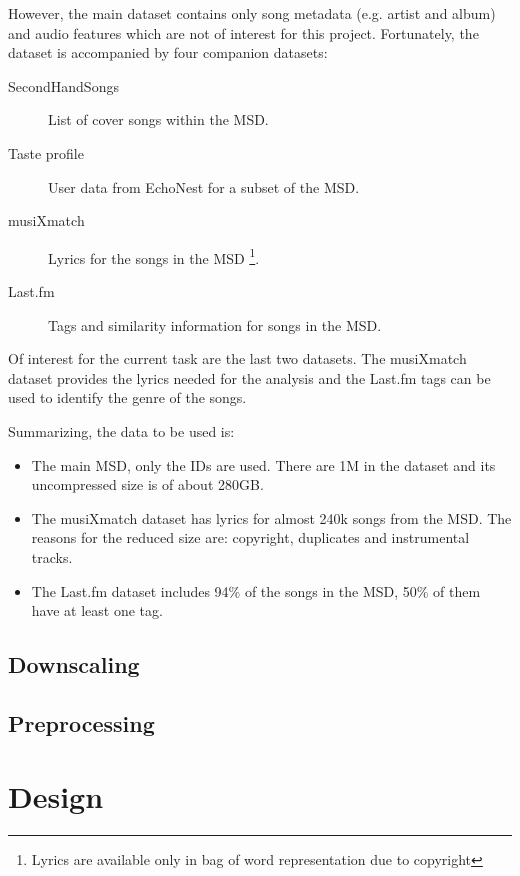 \documentclass[11pt,a4paper,twoside]{scrartcl}
\begin{document}
    However, the main dataset contains only song metadata
    (e.g. artist and album) and audio features which are not of interest
    for this project. Fortunately, the dataset is accompanied by four companion
    datasets:
    
    \begin{description}
      \item[SecondHandSongs] List of cover songs within the MSD.
      \item[Taste profile] User data from EchoNest for a subset of the MSD.
      \item[musiXmatch] Lyrics for the songs in the MSD
                        \footnote{Lyrics are available only in bag of word
                                  representation due to copyright}.
      \item[Last.fm] Tags and similarity information for songs in the MSD.
    \end{description}
    
    Of interest for the current task are the last two datasets. The musiXmatch
    dataset provides the lyrics needed for the analysis and the Last.fm tags can
    be used to identify the genre of the songs.
    
    Summarizing, the data to be used is:
    
    \begin{itemize}
      \item The main MSD, only the IDs are used. There are 1M in the
            dataset and its uncompressed size is of about 280GB.
      \item The musiXmatch dataset has lyrics for almost 240k songs from the
            MSD. The reasons for the reduced size are: copyright, duplicates and
            instrumental tracks.
      \item The Last.fm dataset includes 94\% of the songs in the MSD, 50\% of
            them have at least one tag.
    \end{itemize}

    \subsection{Downscaling}

    \subsection{Preprocessing}
  \section{Design}
\end{document}

